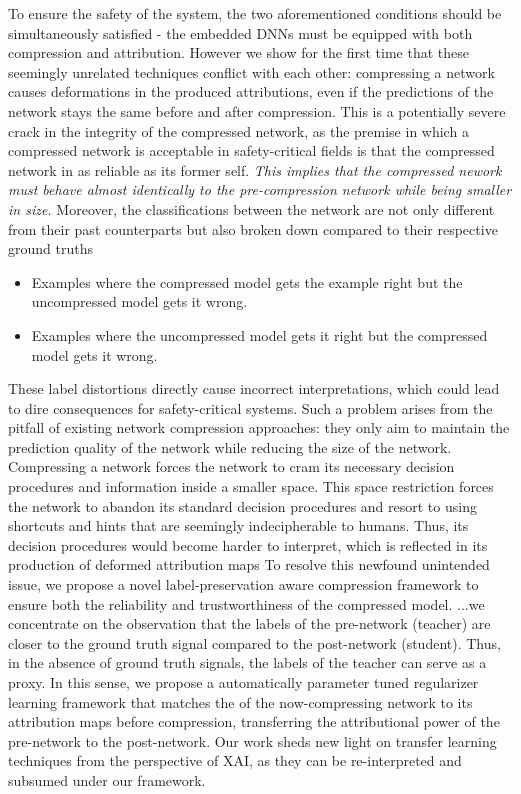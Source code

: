 To ensure the safety of the system, 
the two aforementioned conditions should be simultaneously 
satisfied - the embedded DNNs must be equipped with 
both compression and attribution.
%
%
However we show for the first time that these seemingly
unrelated techniques conflict with each other:
compressing a network causes deformations in 
the produced attributions, even if the predictions 
of the network stays the same before and after compression.
%
%
This is a potentially severe crack in the 
integrity of the compressed network, 
as the premise in which a compressed network 
is acceptable in safety-critical fields is that 
the compressed network in as reliable as its former self.
%
%
\textit{This implies that the compressed nework must behave 
almost identically to the pre-compression network while being
smaller in size.}
%
%
Moreover, the classifications between the network are
not only different from their past counterparts 
but also broken down compared to their respective ground truths
%
%
\begin{itemize}
    \item Examples where the compressed model gets the example 
          right but the uncompressed model gets it wrong.
    \item Examples where the uncompressed model gets it right 
          but the compressed model gets it wrong.
\end{itemize}
%
%
These label distortions directly
cause incorrect interpretations, which could lead to dire 
consequences for safety-critical systems.
%
%
Such a problem arises from the pitfall of existing 
network compression approaches: they only
aim to maintain the prediction quality of the network while 
reducing the size of the network.
%
%
Compressing a network forces the network to cram its 
necessary decision procedures and information inside a
smaller space.
%
This space restriction forces the network to abandon its 
standard decision procedures and resort to using shortcuts 
and hints that are seemingly indecipherable to humans.
%
Thus, its decision procedures would become harder to 
interpret, which is reflected in its production of deformed
attribution maps
%
%
To resolve this newfound unintended
issue, we propose a novel label-preservation aware 
compression framework  to ensure both the reliability and 
trustworthiness of the compressed model.
%
...we concentrate on the observation that the labels 
of the pre-network (teacher) are closer to the ground truth signal 
compared to the post-network (student).
%
Thus, in the absence of ground truth signals, the labels
of the teacher can serve as a proxy. 
%
In this sense, we propose a automatically parameter 
tuned regularizer learning framework that matches the 
of the now-compressing network to its attribution maps 
before compression, transferring the attributional power 
of the pre-network to the post-network. Our work sheds 
new light on transfer learning techniques from the perspective of XAI,
as they can be re-interpreted and subsumed under our framework.

